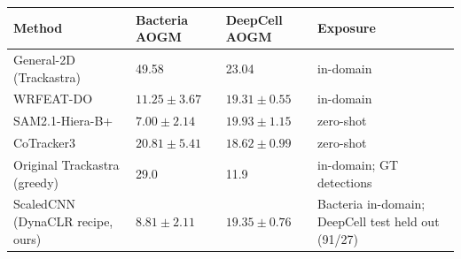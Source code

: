 \begin{frame}
  \centering
  \scriptsize
  \renewcommand{\arraystretch}{1.18}
  \setlength{\tabcolsep}{1.6mm}
  \begin{tabular}{@{}p{40mm}p{24mm}p{24mm}p{40mm}@{}}
    \toprule
    \textbf{Method} & \textbf{Bacteria AOGM} & \textbf{DeepCell AOGM} &
    \textbf{Exposure} \\
    \midrule
    General-2D (Trackastra) & 49.58 & 23.04 & in-domain \\
    WRFEAT-DO & $11.25 \pm 3.67$ & $19.31 \pm 0.55$ & in-domain \\
    SAM2.1-Hiera-B+ & $7.00 \pm 2.14$ & $19.93 \pm 1.15$ & zero-shot \\
    CoTracker3 & $20.81 \pm 5.41$ & $18.62 \pm 0.99$ & zero-shot \\
    Original Trackastra (greedy) & 29.0 & 11.9 & in-domain; GT detections \\
    ScaledCNN (DynaCLR recipe, ours) & $8.81 \pm 2.11$ & $19.35 \pm 0.76$ &
    Bacteria in-domain; DeepCell test held out (91/27) \\
    \bottomrule
  \end{tabular}


\end{frame}

